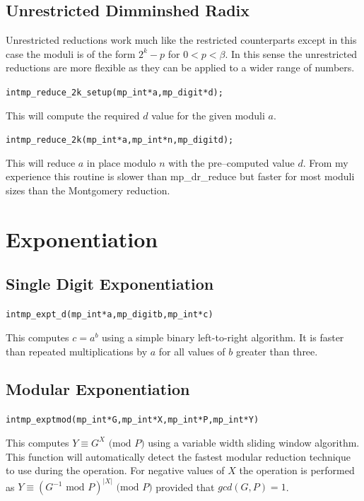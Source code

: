 \documentclass[synpaper]{book}
\begin{document}
\section{Unrestricted Dimminshed Radix}

Unrestricted reductions work much like the restricted counterparts except in this case the moduli is of the 
form $2^k - p$ for $0 < p < \beta$.  In this sense the unrestricted reductions are more flexible as they 
can be applied to a wider range of numbers.  

\begin{alltt}
int mp_reduce_2k_setup(mp_int *a, mp_digit *d);
\end{alltt}

This will compute the required $d$ value for the given moduli $a$.  

\begin{alltt}
int mp_reduce_2k(mp_int *a, mp_int *n, mp_digit d);
\end{alltt}

This will reduce $a$ in place modulo $n$ with the pre--computed value $d$.  From my experience this routine is 
slower than mp\_dr\_reduce but faster for most moduli sizes than the Montgomery reduction.  

\chapter{Exponentiation}
\section{Single Digit Exponentiation}
\begin{alltt}
int mp_expt_d (mp_int * a, mp_digit b, mp_int * c)
\end{alltt}
This computes $c = a^b$ using a simple binary left-to-right algorithm.  It is faster than repeated multiplications by 
$a$ for all values of $b$ greater than three.  

\section{Modular Exponentiation}
\begin{alltt}
int mp_exptmod (mp_int * G, mp_int * X, mp_int * P, mp_int * Y)
\end{alltt}
This computes $Y \equiv G^X \mbox{ (mod }P\mbox{)}$ using a variable width sliding window algorithm.  This function
will automatically detect the fastest modular reduction technique to use during the operation.  For negative values of 
$X$ the operation is performed as $Y \equiv (G^{-1} \mbox{ mod }P)^{\vert X \vert} \mbox{ (mod }P\mbox{)}$ provided that 
$gcd(G, P) = 1$.
\end{document}
